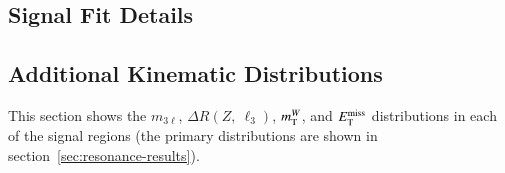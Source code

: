 \subsection{Signal Fit Details}\label{sec:appendix-resonance-signal-fits}


\subsection{Additional Kinematic Distributions}\label{sec:appendix-resonance-SR-distributions}
This section shows the $m_{3\ell}$, $\Delta R(Z,\ \ell_3)$, $m_{\mathrm{T}}^W$, and $E_{\text{T}}^{\text{miss}}$ distributions in each of the signal regions (the primary distributions are shown in section~\ref{sec:resonance-results}).

\begin{figure}[h]
  \centering
\end{figure}
